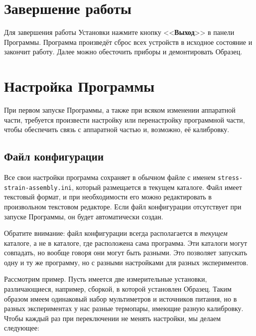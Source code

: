 \documentclass[12pt, a4paper, twocolumn]{book}
\newcommand{\PROGNAME}{stress-strain-assembly}
\newcommand{\CTL}[1]{<<{\bf #1}>>}
\newcommand{\FILENAME}[1]{{\tt #1}}
\begin{document}
\chapter{Завершение работы}

Для завершения работы Установки нажмите кнопку \CTL{Выход} в панели Программы. Программа произведёт сброс всех устройств в исходное состояние и закончит работу. Далее можно обесточить приборы и демонтировать Образец.

\chapter{Настройка Программы}

При первом запуске Программы, а также при всяком изменении аппаратной части, требуется произвести настройку или перенастройку программной части, чтобы обеспечить связь с аппаратной частью и, возможно, её калибровку.

\section{Файл конфигурации}

Все свои настройки программа сохраняет в обычном файле с именем \FILENAME{\PROGNAME{}.ini}, который размещается в текущем каталоге. Файл имеет текстовый формат, и при необходимости его можно редактировать в произвольном текстовом редакторе. Если файл конфигурации отсутствует при запуске Программы, он будет автоматически создан.

Обратите внимание: файл конфигурации всегда располагается в {\it текущем} каталоге, а не в каталоге, где расположена сама программа. Эти каталоги могут совпадать, но вообще говоря они могут быть разными. Это позволяет запускать одну и ту же программу, но с разными настройками для разных экспериментов.

Рассмотрим пример. Пусть имеется две измерительные установки, различающиеся, например, сборкой, в которой установлен Образец. Таким образом имеем одинаковый набор мультиметров и источников питания, но в разных экспериментах у нас разные термопары, имеющие разную калибровку. Чтобы каждый раз при переключении не менять настройки, мы делаем следующее:
\end{document}
